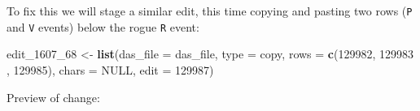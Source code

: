 \documentclass[
]{book}
\newenvironment{Shaded}{\begin{snugshade}}{\end{snugshade}}
\newcommand{\AttributeTok}[1]{\textcolor[rgb]{0.13,0.29,0.53}{#1}}
\newcommand{\ConstantTok}[1]{\textcolor[rgb]{0.56,0.35,0.01}{#1}}
\newcommand{\DecValTok}[1]{\textcolor[rgb]{0.00,0.00,0.81}{#1}}
\newcommand{\FunctionTok}[1]{\textcolor[rgb]{0.13,0.29,0.53}{\textbf{#1}}}
\newcommand{\NormalTok}[1]{#1}
\newcommand{\OtherTok}[1]{\textcolor[rgb]{0.56,0.35,0.01}{#1}}
\newcommand{\StringTok}[1]{\textcolor[rgb]{0.31,0.60,0.02}{#1}}
\begin{document}
To fix this we will stage a similar edit, this time copying and pasting two rows (\texttt{P} and \texttt{V} events) below the rogue \texttt{R} event:

\begin{Shaded}
\begin{Highlighting}[]
\NormalTok{edit\_1607\_68 }\OtherTok{\textless{}{-}} 
  \FunctionTok{list}\NormalTok{(}\AttributeTok{das\_file =}\NormalTok{ das\_file, }
       \AttributeTok{type =} \StringTok{\textquotesingle{}copy\textquotesingle{}}\NormalTok{,}
       \AttributeTok{rows =} \FunctionTok{c}\NormalTok{(}\DecValTok{129982}\NormalTok{, }\DecValTok{129983}\NormalTok{ , }\DecValTok{129985}\NormalTok{),}
       \AttributeTok{chars =} \ConstantTok{NULL}\NormalTok{,}
       \AttributeTok{edit =} \DecValTok{129987}\NormalTok{)}
\end{Highlighting}
\end{Shaded}

Preview of change:
\end{document}
